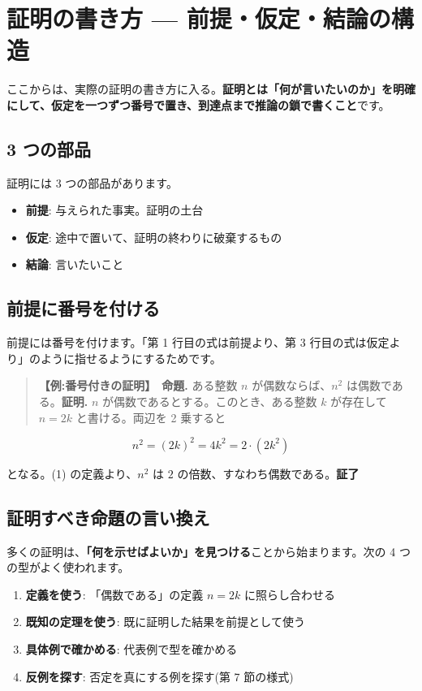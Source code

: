 \documentclass{article}
\begin{document}
\section{証明の書き方 — 前提・仮定・結論の構造}

ここからは、実際の証明の書き方に入る。\textbf{証明とは「何が言いたいのか」を明確にして、仮定を一つずつ番号で置き、到達点まで推論の鎖で書くこと}です。

\subsection{3 つの部品}

証明には 3 つの部品があります。

\begin{itemize}
\item \textbf{前提}: 与えられた事実。証明の土台
\item \textbf{仮定}: 途中で置いて、証明の終わりに破棄するもの
\item \textbf{結論}: 言いたいこと
\end{itemize}

\subsection{前提に番号を付ける}

前提には番号を付けます。「第 1 行目の式は前提より、第 3 行目の式は仮定より」のように指せるようにするためです。

\begin{quote}
\textbf{【例:番号付きの証明】}\ \textbf{命題.} ある整数 \(n\) が偶数ならば、\(n^2\) は偶数である。\textbf{証明.} \(n\) が偶数であるとする。このとき、ある整数 \(k\) が存在して \(n = 2k\) と書ける。両辺を 2 乗すると
\end{quote}

\[ n^2 = (2k)^2 = 4k^2 = 2 \cdot (2k^2) \]

となる。(1) の定義より、\(n^2\) は \(2\) の倍数、すなわち偶数である。\textbf{証了}

\subsection{証明すべき命題の言い換え}

多くの証明は、\textbf{「何を示せばよいか」を見つける}ことから始まります。次の 4 つの型がよく使われます。

\begin{enumerate}
\item \textbf{定義を使う}: 「偶数である」の定義 \(n = 2k\) に照らし合わせる
\item \textbf{既知の定理を使う}: 既に証明した結果を前提として使う
\item \textbf{具体例で確かめる}: 代表例で型を確かめる
\item \textbf{反例を探す}: 否定を真にする例を探す(第 7 節の様式)
\end{enumerate}
\end{document}
